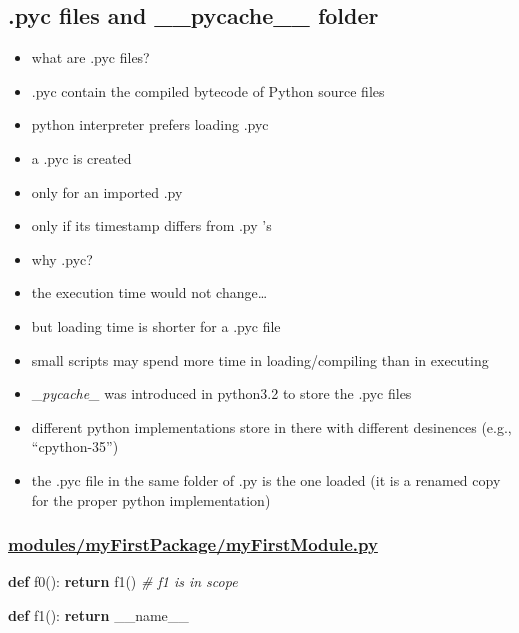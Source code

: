 \documentclass[11pt]{article}
\providecommand{\tightlist}{%
      \setlength{\itemsep}{0pt}\setlength{\parskip}{0pt}}
\newenvironment{Shaded}{}{}
\newcommand{\KeywordTok}[1]{\textcolor[rgb]{0.00,0.44,0.13}{\textbf{{#1}}}}
\newcommand{\CommentTok}[1]{\textcolor[rgb]{0.38,0.63,0.69}{\textit{{#1}}}}
\newcommand{\NormalTok}[1]{{#1}}
\newcommand{\VariableTok}[1]{\textcolor[rgb]{0.10,0.09,0.49}{{#1}}}
\newcommand{\ControlFlowTok}[1]{\textcolor[rgb]{0.00,0.44,0.13}{\textbf{{#1}}}}
\begin{document}
    \hypertarget{pyc-files-and-__pycache__-folder}{%
\subsection{.pyc files and \_\_pycache\_\_
folder}\label{pyc-files-and-__pycache__-folder}}

\begin{itemize}
\tightlist
\item
  what are .pyc files?
\item
  .pyc contain the compiled bytecode of Python source files
\item
  python interpreter prefers loading .pyc
\item
  a .pyc is created
\item
  only for an imported .py
\item
  only if its timestamp differs from .py 's
\item
  why .pyc?
\item
  the execution time would not change\ldots{}
\item
  but loading time is shorter for a .pyc file
\item
  small scripts may spend more time in loading/compiling than in
  executing
\item
  \_\emph{pycache\_} was introduced in python3.2 to store the .pyc files
\item
  different python implementations store in there with different
  desinences (e.g., ``cpython-35'')
\item
  the .pyc file in the same folder of .py is the one loaded (it is a
  renamed copy for the proper python implementation)
\end{itemize}

    \hypertarget{modulesmyfirstpackagemyfirstmodule.py}{%
\subsubsection{\texorpdfstring{\url{modules/myFirstPackage/myFirstModule.py}}{modules/myFirstPackage/myFirstModule.py}}\label{modulesmyfirstpackagemyfirstmodule.py}}

\begin{Shaded}
\begin{Highlighting}[]
\KeywordTok{def}\NormalTok{ f0():}
    \ControlFlowTok{return}\NormalTok{ f1() }\CommentTok{\# f1 is in scope}

\KeywordTok{def}\NormalTok{ f1():}
    \ControlFlowTok{return} \VariableTok{\_\_name\_\_}
\end{Highlighting}
\end{Shaded}
\end{document}
